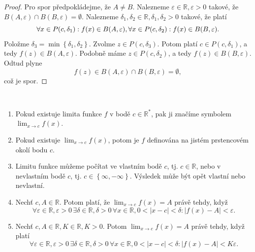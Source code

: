 \begin{proof}
	Pro spor předpokládejme, že $A\ne B$. Nalezneme $\varepsilon \in \mathbb R , \varepsilon >0$
	takové, že $B(A,\varepsilon)\cap B(B,\varepsilon) = \emptyset$. Nalezneme $\delta_1, \delta_2 \in \mathbb R ,
	\delta_1, \delta_2 > 0$ takové, že platí
	$$
	    \forall x \in P(c,\delta_1): f(x) \in B(A,\varepsilon),\\
		\forall x \in P(c,\delta_2): f(x) \in B(B,\varepsilon).
	$$
	Položme $\delta_3 = \min \left \{ \delta_1, \delta_2 \right \} $. Zvolme $z\in P(c,\delta_3)$.
	Potom platí $c\in P(c,\delta_1)$, a tedy $f(z)\in B(A,\varepsilon).$ Podobně
	máme $z\in P(c,\delta_2)$, a tedy $f(z)\in B(B,\varepsilon).$ Odtud plyne
	$$
	    f(z)\in B(A, \varepsilon) \cap B(B,\varepsilon) = \emptyset,
	$$
	což je spor.
\end{proof}

\begin{poznamka}\,
\begin{enumerate}[(1)]
	\item Pokud existuje limita funkce $f$ v bodě $c\in \mathbb R ^*$, pak ji značíme symbolem
	$\lim_{x\to c} f(x)$.
	\item Pokud existuje $\lim_{x\to c} f(x)$, potom je $f$ definována na jistém prstencovém okolí
	bodu $c$.
	\item Limitu funkce můžeme počítat ve vlastním bodě $c$, tj. $c\in \mathbb R $, nebo v nevlastním
	bodě $c$, tj. $c\in \left \{ \infty, -\infty \right \} $. Výsledek může být opět vlastní nebo
	nevlastní.
	\item Nechť $c, A\in \mathbb R .$ Potom platí, že $\lim_{x\to c}f(x)=A$ právě tehdy, když
	$$
	    \forall \varepsilon \in \mathbb R , \varepsilon > 0 \, \exists \delta \in \mathbb R , \delta > 0 \, \forall x \in \mathbb R , 0 < |x-c|<\delta:|f(x)-A|<\varepsilon.
	$$
	\item Nechť $c,A\in \mathbb R , K\in \mathbb R , K>0$. Potom $\lim_{x\to c}f(x)=A$ právě tehdy, když platí
	$$
	\forall \varepsilon \in \mathbb R , \varepsilon > 0 \, \exists \delta \in \mathbb R , \delta > 0 \, \forall x \in \mathbb R , 0 < |x-c|<\delta:|f(x)-A|<K\varepsilon.
	$$
\end{enumerate}
\end{poznamka}

